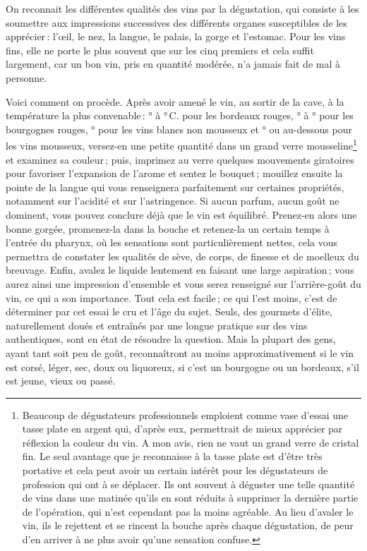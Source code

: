 On reconnait les différentes qualités des vins par la dégustation, qui consiste
à les soumettre aux impressions successives des différents organes susceptibles
de les apprécier : l'œil, le nez, la langue, le palais, la gorge et l'estomac.
Pour les vins fins, elle ne porte le plus souvent que sur les cinq premiers et
cela suffit largement, car un bon vin, pris en quantité modérée, n'a jamais
fait de mal à personne.

Voici comment on procède. Après avoir amené le vin, au sortir de la cave, à la
température la plus convenable : {\mmm}° à {\mmm}° C. pour les
bordeaux rouges, {\mmm}° à {\mmm}° pour les bourgognes rouges,
{\mmm}° pour les vins blancs non mousseux et {\mmm}° ou au-dessous
pour les vins mousseux, versez-en une petite quantité dans un grand verre
mousseline\footnote{Beaucoup de dégustateurs professionnels emploient comme
vase d'essai une tasse plate en argent qui, d'après eux, permettrait de mieux
apprécier par réflexion la couleur du vin. A mon avis, rien ne vaut un grand
verre de cristal fin. Le seul avantage que je reconnaisse à la tasse plate est
d'être très portative et cela peut avoir un certain intérêt pour les
dégustateurs de profession qui ont à se déplacer. Ils ont souvent à déguster
une telle quantité de vins dans une matinée qu'ils en sont réduits à supprimer
la dernière partie de l'opération, qui n’est cependant pas la moins agréable.
Au lieu d'avaler le vin, ils le rejettent et se rincent la bouche après chaque
dégustation, de peur d'en arriver à ne plus avoir qu'une sensation confuse.} et
examinez sa couleur ; puis, imprimez au verre quelques mouvements giratoires
pour favoriser l'expansion de l'arome et sentez le bouquet ; mouillez ensuite
la pointe de la langue qui vous renseignera parfaitement sur certaines
propriétés, notamment sur l'acidité et sur l'astringence. Si aucun parfum,
aucun goût ne dominent, vous pouvez conclure déjà que le vin est équilibré.
Prenez-en alors une bonne gorgée, promenez-la dans la bouche et retenez-la un
certain temps à l'entrée du pharynx, où les sensations sont particulièrement
nettes, cela vous permettra de constater les qualités de sève, de corps, de
finesse et de moelleux du breuvage. Enfin, avalez le liquide lentement en
faisant une large aspiration ; vous aurez ainsi une impression d'ensemble et
vous serez renseigné sur l'arrière-goût du vin, ce qui a son importance. Tout
cela est facile ; ce qui l'est moins, c'est de déterminer par cet essai le cru
et l'âge du sujet. Seuls, des gourmets d'élite, naturellement doués et
entraînés par une longue pratique sur des vins authentiques, sont en état de
résoudre la question. Mais la plupart des gens, ayant tant soit peu de goût,
reconnaîtront au moins approximativement si le vin est corsé, léger, sec, doux
ou liquoreux, si c'est un bourgogne ou un bordeaux, s'il est jeune, vieux ou
passé.

